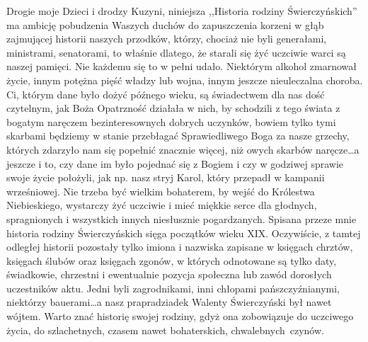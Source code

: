 Drogie moje Dzieci i drodzy Kuzyni, niniejsza ,,Historia rodziny Świerczyńskich'' ma ambicję pobudzenia Waszych duchów do zapuszczenia korzeni w głąb zajmującej historii naszych przodków, którzy, chociaż nie byli generałami, ministrami, senatorami, to właśnie dlatego, że starali się żyć uczciwie warci są naszej pamięci. Nie każdemu się to w pełni udało. Niektórym alkohol zmarnował życie, innym potężna pięść władzy lub wojna, innym jeszcze nieuleczalna choroba. Ci, którym dane było dożyć późnego wieku, są świadectwem dla nas dość czytelnym, jak Boża Opatrzność działała w nich,  by schodzili z tego świata z bogatym naręczem bezinteresownych dobrych uczynków, bowiem tylko tymi skarbami będziemy w stanie przebłagać Sprawiedliwego Boga za nasze grzechy, których zdarzyło nam się popełnić znacznie więcej, niż owych skarbów naręcze\ldots a jeszcze i to, czy dane im było pojednać się z Bogiem i czy w godziwej sprawie swoje życie położyli, jak np. nasz stryj Karol, który przepadł w kampanii wrześniowej. Nie trzeba być wielkim bohaterem, by wejść do Królestwa Niebieskiego, wystarczy żyć uczciwie i mieć miękkie serce dla głodnych, spragnionych i wszystkich innych niesłusznie pogardzanych. Spisana przeze mnie historia rodziny Świerczyńskich sięga początków wieku XIX. Oczywiście, z tamtej odległej historii pozostały tylko imiona i nazwiska zapisane w księgach chrztów, księgach ślubów oraz księgach zgonów, w których odnotowane są tylko daty, świadkowie, chrzestni i ewentualnie pozycja społeczna lub zawód dorosłych uczestników aktu. Jedni byli zagrodnikami, inni chłopami pańszczyźnianymi, niektórzy bauerami\ldots a nasz prapradziadek Walenty Świerczyński był nawet wójtem. Warto znać historię swojej rodziny, gdyż ona zobowiązuje do uczciwego życia, do szlachetnych, czasem nawet bohaterskich, chwalebnych~czynów.